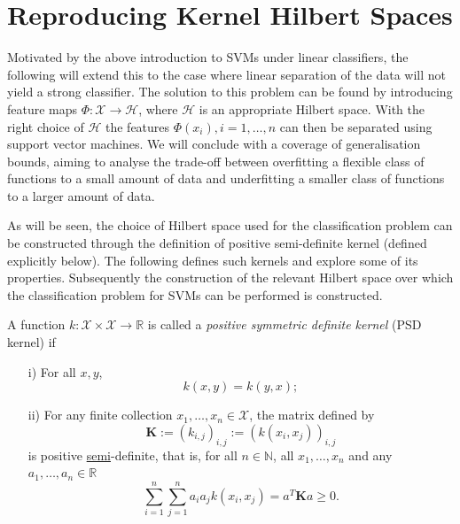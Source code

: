 %

\section{Reproducing Kernel Hilbert Spaces}

Motivated by the above introduction to SVMs under linear classifiers, the following will extend this to the case where linear separation of the data will not yield a strong classifier. The solution to this problem can be found by introducing feature maps $\Phi\colon \mathcal{X} \rightarrow \mathcal{H}$, where $\mathcal{H}$ is an appropriate Hilbert space. With the right choice of $\mathcal{H}$ the features $\Phi(x_i), i=1, \ldots, n$ can then be separated using support vector machines. We will conclude with a coverage of generalisation bounds, aiming to analyse the trade-off between overfitting a flexible class of functions to a small amount of data and underfitting a smaller class of functions to a larger amount of data.

As will be seen, the choice of Hilbert space used for the classification problem can be constructed through the definition of positive semi-definite kernel (defined explicitly below).  The following defines such kernels and explore some of its properties. Subsequently the construction of the relevant Hilbert space over which the classification problem for SVMs can be performed is constructed.

\begin{definition}
A function $k\colon \mathcal{X}\times \mathcal{X} \rightarrow \mathbb{R}$ is called a \emph{positive symmetric definite kernel} (PSD kernel) if
\begin{itemize}
	\item[i)] For all $x, y$, $$k(x, y)=k(y, x);$$
	\item[ii)] For any finite collection $x_1, \ldots, x_n \in \mathcal{X}$, the matrix defined by
	\begin{equation}
		\mathbf{K} := (k_{i,j})_{i,j} := (k(x_i, x_j))_{i,j}
	\end{equation}
	is positive \underline{semi}-definite, that is, for all $n\in \mathbb{N}$, all $x_1, \ldots, x_n$ and any $a_1, \ldots, a_n \in \mathbb{R}$
	\begin{equation*}
	 \sum_{i=1}^n\sum_{j=1}^n a_ia_j k(x_i, x_j) = a^T\mathbf{K}a \geq 0.
	\end{equation*}
\end{itemize}
\end{definition}


